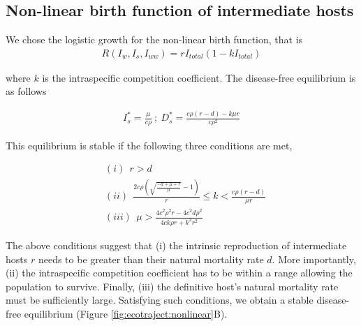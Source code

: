 \documentclass[11pt]{article}
\begin{document}
\subsection*{Non-linear birth function of intermediate hosts}
We chose the logistic growth for the non-linear birth function, that is \begin{align*}
R(I_w, I_s,I_{ww}) = r I_{total} (1 - k I_{total})
\end{align*}

where $k$ is the intraspecific competition coefficient. 
The disease-free equilibrium is as follows

\begin{align*}
I_s^* = \frac{\mu}{c \rho } \ ;\  D_s^* = \frac{c \rho  (r-d) - k \mu  r}{c \rho ^2}
\end{align*}

This equilibrium is stable if the following three conditions are met,

\begin{align*}
& (i)\ \  r > d \\
& (ii)\ \  \frac{2 c \rho  \left(\sqrt{\frac{-d+\mu +r}{\mu }}-1\right)}{r}\leq  k < \frac{c \rho  (r-d)}{\mu  r} \\
& (iii)\ \  \mu  >\frac{4 c^2 \rho ^2 r - 4 c^2 d \rho ^2}{4 c k \rho r + k^2 r^2}
\end{align*}

The above conditions suggest that (i) the intrinsic reproduction of intermediate hosts $r$ needs to be greater than their natural mortality rate $d$. 
More importantly, (ii) the intraspecific competition coefficient has to be within a range allowing the population to survive.
Finally, (iii) the definitive host's natural mortality rate must be sufficiently large. 
Satisfying such conditions, we obtain a stable disease-free equilibrium (Figure \ref{fig:ecotraject:nonlinear}B).
\end{document}
